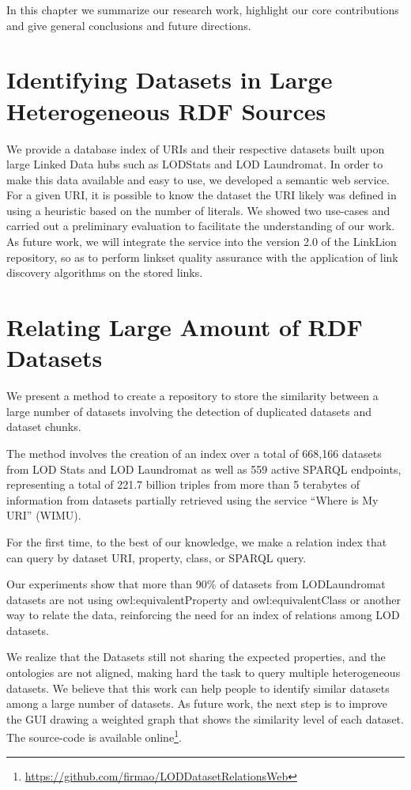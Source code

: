 In this chapter we summarize our research work, highlight our core contributions and give general conclusions and future directions.

\section{Identifying Datasets in Large Heterogeneous RDF Sources}
We provide a database index of URIs and their respective datasets built upon large Linked Data hubs such as LODStats and LOD Laundromat.
In order to make this data available and easy to use, we developed a semantic web service.
For a given URI, it is possible to know the dataset the URI likely was defined in using a heuristic based on the number of literals. 
We showed two use-cases and carried out a preliminary evaluation to facilitate the understanding of our work.
As future work, we will integrate the service into the version 2.0 of the LinkLion repository, so as to perform linkset quality assurance with the application of link discovery algorithms on the stored links.

\section{Relating Large Amount of RDF Datasets}
We present a method to create a repository to store the similarity between a large number of datasets involving the detection of duplicated datasets and dataset chunks.

The method involves the creation of an index over a total of 668,166 datasets from LOD Stats and LOD Laundromat as well as 559 active SPARQL endpoints, representing a total of 221.7 billion triples from more than 5 terabytes of information from datasets partially retrieved using the service ``Where is My URI'' (WIMU). 

For the first time, to the best of our knowledge, we make a relation index that can query by dataset URI, property, class, or SPARQL query.

Our experiments show that more than 90\% of datasets from LODLaundromat datasets are not using owl:equivalentProperty and owl:equivalentClass or another way to relate the data, reinforcing the need for an index of relations among LOD datasets.

We realize that the Datasets still not sharing the expected properties, and the ontologies are not aligned, making hard the task to query multiple heterogeneous datasets.
We believe that this work can help people to identify similar datasets among a large number of datasets.
As future work, the next step is to improve the GUI drawing a weighted graph that shows the similarity level of each dataset.
The source-code is available online\footnote{\url{https://github.com/firmao/LODDatasetRelationsWeb}}.

